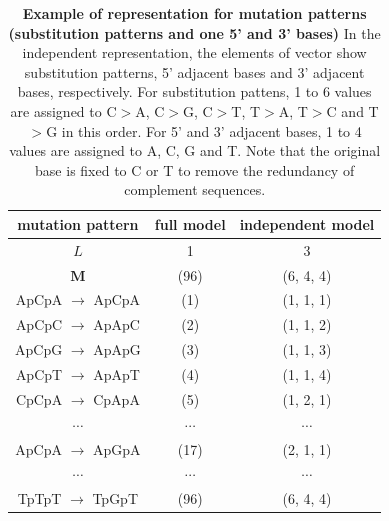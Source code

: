 \documentclass{article}
\begin{document}
\begin{table}[!ht]
\caption{
{\bf Example of representation for mutation patterns (substitution patterns and one 5' and 3' bases)}
In the independent representation, the elements of vector show substitution patterns, 5' adjacent bases and 3' adjacent bases, respectively.
For substitution pattens, 1 to 6 values are assigned to C$>$A, C$>$G, C$>$T, T$>$A, T$>$C and T$>$G in this order.
For 5' and 3' adjacent bases, 1 to 4 values are assigned to A, C, G and T.
Note that the original base is fixed to C or T to remove the redundancy of complement sequences.
}
\begin{center}
\begin{tabular}{|c|c|c|} \hline
mutation pattern & full model & independent model \\ \hline
$L$ & 1  & 3  \\
$\bm{M}$ & (96)  & (6, 4, 4) \\  \hline
ApCpA $\to$ ApCpA & (1)  & (1, 1, 1)  \\ 
ApCpC $\to$ ApApC & (2)  & (1, 1, 2)  \\ 
ApCpG $\to$ ApApG & (3)  & (1, 1, 3)  \\
ApCpT $\to$ ApApT & (4)  & (1, 1, 4)  \\
CpCpA $\to$ CpApA & (5)  & (1, 2, 1) \\
$\cdots$ & $\cdots$ & $\cdots$ \\
ApCpA $\to$ ApGpA & (17)  & (2, 1, 1) \\
$\cdots$ & $\cdots$ & $\cdots$ \\
TpTpT $\to$ TpGpT & (96)  & (6, 4, 4) \\ \hline
\end{tabular}
\end{center}
\label{tab_rep}
\end{table}



\clearpage
\end{document}
